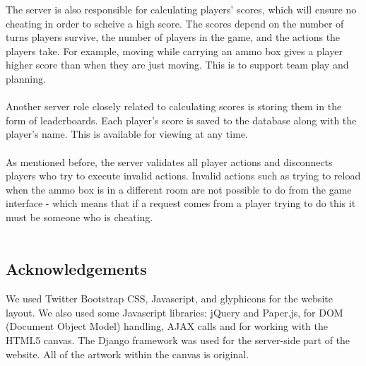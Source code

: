 \documentclass{article}
\begin{document}
The server is also responsible for calculating players' scores, which will ensure no cheating in order to scheive a high score. The scores depend on the number of turns players survive, the number of players in the game, and the actions the players take. For example, moving while carrying an ammo box gives a player higher score than when they are just moving. This is to support team play and planning. \\ \\
Another server role closely related to calculating scores is storing them in the form of leaderboards. Each player's score is saved to the database along with the player's name. This is available for viewing at any time. \\ \\
As mentioned before, the server validates all player actions and disconnects players who try to execute invalid actions. Invalid actions such as trying to reload when the ammo box is in a different room are not possible to do from the game interface - which means that if a request comes from a player trying to do this it must be someone who is cheating. \\ \\

\subsection{Acknowledgements}
We used Twitter Bootstrap CSS, Javascript, and glyphicons for the website layout. We also used some Javascript libraries: jQuery and Paper.js, for DOM (Document Object Model) handling, AJAX calls and for working with the HTML5 canvas. The Django framework was used for the server-side part of the website. All of the artwork within the canvas is original. \\ \\
\end{document}
